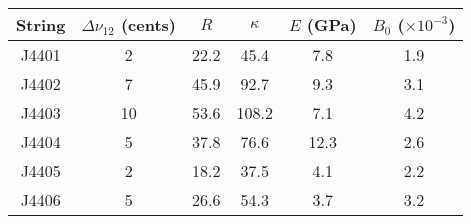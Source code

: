 \begin{tabular}{cccccc}
\toprule
String &  $\Delta \nu_{12}$ (cents) &  $R$ &  $\kappa$ &  $E$ (GPa) &  $B_0$ ($\times 10^{-3}$) \\
\midrule
 J4401 &                          2 & 22.2 &      45.4 &        7.8 &                       1.9 \\
 J4402 &                          7 & 45.9 &      92.7 &        9.3 &                       3.1 \\
 J4403 &                         10 & 53.6 &     108.2 &        7.1 &                       4.2 \\
 J4404 &                          5 & 37.8 &      76.6 &       12.3 &                       2.6 \\
 J4405 &                          2 & 18.2 &      37.5 &        4.1 &                       2.2 \\
 J4406 &                          5 & 26.6 &      54.3 &        3.7 &                       3.2 \\
\bottomrule
\end{tabular}

